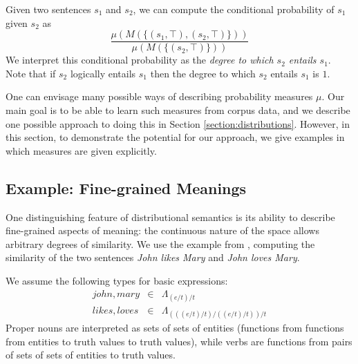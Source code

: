 \documentclass{svmult}
\begin{document}
Given two sentences $s_1$ and $s_2$, we can compute the conditional
probability of $s_1$ given $s_2$ as
$$\frac{\mu(M(\{(s_1, \top), (s_2, \top)\}))}{\mu(M(\{(s_2,\top)\}))}$$
We interpret this conditional probability as the {\em degree to which $s_2$ entails $s_1$\/}. Note that if $s_2$ logically entails $s_1$ then the degree to which  $s_2$ entails $s_1$ is $1$.




One can envisage many possible ways of describing probability measures
$\mu$. Our main goal is to be able to learn such measures from corpus
data, and we describe one possible approach to doing this in Section
\ref{section:distributions}. However, in this section, to demonstrate
the potential for our approach, we give examples in which measures are
given explicitly.
 
\subsection{Example: Fine-grained Meanings}

One distinguishing feature of distributional semantics is its ability
to describe fine-grained aspects of meaning: the continuous nature of
the space allows arbitrary degrees of similarity. We use the example
from \cite{Clark:08}, computing the similarity of the two sentences
\emph{John likes Mary} and \emph{John loves Mary}.

We assume the following types for basic expressions:
\begin{eqnarray*}
\mathit{john},\mathit{mary} & \in & \Lambda_{(e/t)/t}\\
\mathit{likes}, \mathit{loves} & \in & \Lambda_{(((e/t)/t)/((e/t)/t))/t}
\end{eqnarray*}
Proper nouns are interpreted as sets of sets of entities (functions
from functions from entities to truth values to truth values), while
verbs are functions from pairs of sets of sets of entities to truth
values.
\end{document}
